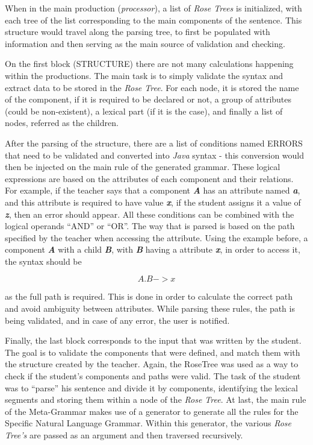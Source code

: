 When in the main production (\emph{processor}), a list of \emph{Rose Trees} is initialized, with each tree of the list corresponding to the main components of the sentence. This structure would travel along the parsing tree, to first be populated with information and then serving as the main source of validation and checking.

On the first block (STRUCTURE) there are not many calculations happening within the productions. 
The main task is to simply validate the syntax and extract data to be stored in the \emph{Rose Tree}. 
For each node, it is stored the name of the component, if it is required to be declared or not, a group of attributes (could be non-existent), 
a lexical part (if it is the case), and finally a list of nodes, referred as the children.

After the parsing of the structure, there are a list of conditions named ERRORS that need to be validated and converted into \emph{Java} syntax - this conversion would then be injected on the main rule of the generated grammar. These logical expressions are based on the attributes of each component and their relations. For example, if the teacher says that a component \emph{\textbf{A}} has an attribute named \emph{\textbf{a}}, and this attribute is required to have value \emph{\textbf{x}}, if the student assigns it a value of \emph{\textbf{z}}, then an error should appear. All these conditions can be combined with the logical operands ``AND'' or ``OR''. The way that is parsed is based on the path specified by the teacher when accessing the attribute. Using the example before, a component \emph{\textbf{A}} with a child \emph{\textbf{B}}, with \emph{\textbf{B}} having a attribute \emph{\textbf{x}}, in order to access it, the syntax should be

\[ A.B -> x \]

\noindent as the full path is required. This is done in order to calculate the correct path and avoid ambiguity between attributes. While parsing these rules, the path is being validated, and in case of any error, the user is notified.

Finally, the last block corresponds to the input that was written by the student. 
The goal is to validate the components that were defined, and match them with the structure created by the teacher. 
Again, the RoseTree was used as a way to check if the student’s components and paths were valid. 
The task of the student was to ``parse'' his sentence and divide it by components, identifying the lexical segments and storing them within a node of the \emph{Rose Tree}. 
At last, the main rule of the Meta-Grammar makes use of a generator to generate all the rules for the Specific Natural Language Grammar. 
Within this generator, the various \emph{Rose Tree's} are passed as an argument and then traversed recursively.


